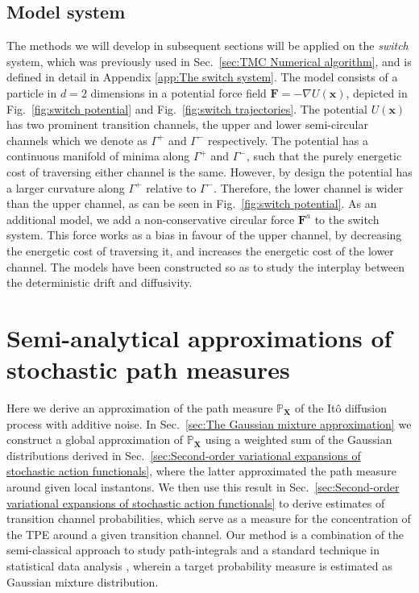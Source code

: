 \subsection{Model system}

The methods we will develop in subsequent sections will be applied on the \textit{switch} system, which was previously used in Sec.~\ref{sec:TMC Numerical algorithm}, and is defined in detail in Appendix \ref{app:The switch system}.
The model consists of a particle in $d=2$ dimensions in a potential force field $\mathbf{F}=-\nabla U(\mathbf{x})$, depicted in Fig.~\ref{fig:switch potential} and Fig.~\ref{fig:switch trajectories}.
The potential $U(\mathbf{x})$ has two prominent transition channels, the upper and lower semi-circular channels which we denote as $\Gamma^{+}$ and $\Gamma^{-}$ respectively. The potential has a continuous manifold of minima along $\Gamma^{+}$ and $\Gamma^{-}$, such that the purely energetic cost of traversing either channel is the same. However, by design the potential has a larger curvature along $\Gamma^{+}$ relative to $\Gamma^{-}$. Therefore, the lower channel is wider than the upper channel, as can be seen in Fig.~\ref{fig:switch potential}. As an additional model, we add a non-conservative circular force $\mathbf{F}^{a}$ to the switch system. This force works as a bias in favour of the upper channel, by decreasing the energetic cost of traversing it, and increases the energetic cost of the lower channel. The models have been constructed so as to study the interplay between the deterministic drift and diffusivity.

\section{Semi-analytical approximations of stochastic path measures} \label{sec:Semi-analytical approximations of stochastic path measures}

Here we derive an approximation of the path measure $\mathbb{P}_\mathbf{X}$ of the It\^{o} diffusion process with additive noise. In Sec.~\ref{sec:The Gaussian mixture approximation} we construct a global approximation of $\mathbb{P}_\mathbf{X}$ using a weighted sum of the Gaussian distributions derived in Sec.~\ref{sec:Second-order variational expansions of stochastic action functionals}, where the latter approximated the path measure around given local instantons. We then use this result in Sec.~\ref{sec:Second-order variational expansions of stochastic action functionals} to derive estimates of transition channel probabilities, which serve as a measure for the concentration of the TPE around a given transition channel. Our method is a combination of the semi-classical approach to study path-integrals \citep{chaichianPathIntegralsPhysics2001, schulmanTechniquesApplicationsPath1996, smirnovEstimationPathIntegral2010, moretteDefinitionApproximationFeynman1951, marinovPathIntegralsQuantum1980, sakuraiModernQuantumMechanics2017} and a standard technique in statistical data analysis \citep{gelmanBayesianDataAnalysis, scottMultivariateDensityEstimation2015, goodfellowDeepLearning2016, nguyenApproximationFiniteMixtures2020, carreira-perpinanModefindingMixturesGaussian2000}, wherein a target probability measure is estimated as Gaussian mixture distribution. 


